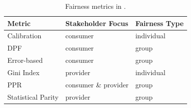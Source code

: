 
\begin{table}[tb]
\centering
\caption{Fairness metrics in \libauto.}
\label{tab:fair_metrics}
\begin{threeparttable}
\begin{tabular}{lll}
\toprule
Metric            & Stakeholder Focus     & Fairness Type \\\midrule
Calibration        & consumer             & individual \\
DPF                & consumer             & group \\
Error-based        & consumer             & group \\
Gini Index         & provider             & individual \\
PPR                & consumer \& provider & group \\
Statistical Parity & provider             & group \\
\bottomrule
                                 
\end{tabular}
\end{threeparttable}
\end{table}




